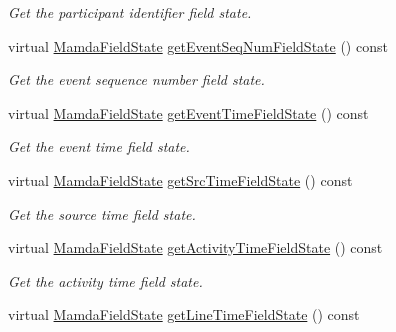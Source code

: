\begin{CompactItemize}
\begin{CompactList}\small\item\em Get the participant identifier field state. \item\end{CompactList}\item 
virtual \hyperlink{namespaceWombat_93aac974f2ab713554fd12a1fa3b7d2a}{Mamda\-Field\-State} \hyperlink{classWombat_1_1MamdaOrderBookConcreteSimpleDelta_cb5617269c6616eacf33355531a1306d}{get\-Event\-Seq\-Num\-Field\-State} () const 
\begin{CompactList}\small\item\em Get the event sequence number field state. \item\end{CompactList}\item 
virtual \hyperlink{namespaceWombat_93aac974f2ab713554fd12a1fa3b7d2a}{Mamda\-Field\-State} \hyperlink{classWombat_1_1MamdaOrderBookConcreteSimpleDelta_00da14e2c14ad95ab8484bce70ba6536}{get\-Event\-Time\-Field\-State} () const 
\begin{CompactList}\small\item\em Get the event time field state. \item\end{CompactList}\item 
virtual \hyperlink{namespaceWombat_93aac974f2ab713554fd12a1fa3b7d2a}{Mamda\-Field\-State} \hyperlink{classWombat_1_1MamdaOrderBookConcreteSimpleDelta_f5679fbd65c7406cc4e6b905460a5159}{get\-Src\-Time\-Field\-State} () const 
\begin{CompactList}\small\item\em Get the source time field state. \item\end{CompactList}\item 
virtual \hyperlink{namespaceWombat_93aac974f2ab713554fd12a1fa3b7d2a}{Mamda\-Field\-State} \hyperlink{classWombat_1_1MamdaOrderBookConcreteSimpleDelta_7860a6d80ad23193276b19faef6db47f}{get\-Activity\-Time\-Field\-State} () const 
\begin{CompactList}\small\item\em Get the activity time field state. \item\end{CompactList}\item 
virtual \hyperlink{namespaceWombat_93aac974f2ab713554fd12a1fa3b7d2a}{Mamda\-Field\-State} \hyperlink{classWombat_1_1MamdaOrderBookConcreteSimpleDelta_bee5379fb48632af52473efa00f8e92b}{get\-Line\-Time\-Field\-State} () const 

\end{CompactItemize}
